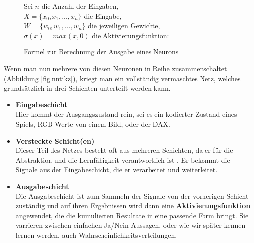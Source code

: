             \begin{figure}[H]
                \begin{mdframed}
                    \noindent
                    Sei $n$ die Anzahl der Eingaben,\\
                    \hspace*{4.5mm}    $X = \{x_0,x_1,...,x_n\}$ die Eingabe,\\
                    \hspace*{4.5mm}    $W = \{w_0, w_1,...,w_n\}$ die jeweiligen Gewichte, \\
                    \hspace*{4.5mm}    $\sigma(x) = max(x,0)$ die Aktivierungsfunktion:\\[4mm]
                    \hspace*{50mm} 
                \end{mdframed}
                \formforfigure
                \caption{\label{neuron-math} Formel zur Berechnung der Ausgabe eines Neurons}
            \end{figure}

            \noindent
            Wenn man nun mehrere von diesen Neuronen in Reihe zusammenschaltet (Abbildung \ref{fig:nntikz}), kriegt man ein vollständig vermaschtes Netz, welches grundsätzlich in drei Schichten unterteilt werden kann.
            \begin{itemize}
                \setlength{\itemsep}{5pt}
                \item \textbf{Eingabeschicht} \\
                    Hier kommt der Ausgangszustand rein, sei es ein kodierter Zustand eines Spiels, RGB Werte von einem Bild, oder der DAX.
                \item \textbf{Versteckte Schicht(en)} \\
                    Dieser Teil des Netzes besteht oft aus mehreren Schichten, da er für die Abstraktion und die Lernfähigkeit verantwortlich ist \cite{ANNModeling}. Er bekommt die Signale aus der Eingabeschicht, die er verarbeitet und weiterleitet.
                \item \textbf{Ausgabeschicht} \\
                    Die Ausgabeschicht ist zum Sammeln der Signale von der vorherigen Schicht zuständig und auf ihren Ergebnissen wird dann eine \textbf{Aktivierungsfunktion} angewendet, die die kumulierten Resultate in eine passende Form bringt. Sie varrieren zwischen einfachen Ja/Nein Aussagen, oder wie wir später kennen lernen werden, auch Wahrscheinlichkeitsverteilungen.

            \end{itemize}

